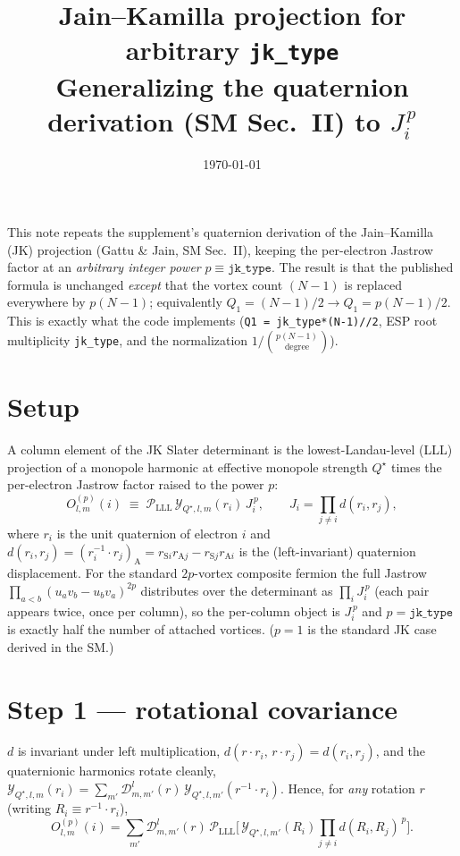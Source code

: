 \documentclass[11pt]{article}
\title{\textbf{Jain--Kamilla projection for arbitrary \texttt{jk\_type}}\\[2pt]
\large Generalizing the quaternion derivation (SM Sec.~II) to $J_i^{\,p}$}
\author{}
\date{\today}
\newcommand{\LLL}{\mathcal{P}_{\mathrm{LLL}}}
\newcommand{\Ycal}{\mathcal{Y}}
\newcommand{\Dcal}{\mathcal{D}}
\newcommand{\Qs}{Q^{\star}}
\newcommand{\jk}{\mathtt{jk\_type}}
\begin{document}
\maketitle

\noindent
This note repeats the supplement's quaternion derivation of the Jain--Kamilla (JK) projection
(Gattu \& Jain, SM Sec.~II), keeping the per-electron Jastrow factor at an \emph{arbitrary
integer power} $p \equiv \jk$. The result is that the published formula is unchanged
\emph{except} that the vortex count $(N-1)$ is replaced everywhere by $p(N-1)$; equivalently
$Q_1 = (N-1)/2 \to Q_1 = p(N-1)/2$. This is exactly what the code implements
(\texttt{Q1 = jk\_type*(N-1)//2}, ESP root multiplicity \texttt{jk\_type}, and the
normalization $1/\binom{p(N-1)}{\text{degree}}$).

\section{Setup}

A column element of the JK Slater determinant is the lowest-Landau-level (LLL) projection of a
monopole harmonic at effective monopole strength $\Qs$ times the per-electron Jastrow factor
raised to the power $p$:
\begin{equation}
  O^{(p)}_{l,m}(i)\;\equiv\;\LLL\,\Ycal_{\Qs,l,m}(r_i)\,J_i^{\,p},
  \qquad
  J_i=\prod_{j\neq i} d(r_i,r_j),
  \label{eq:object}
\end{equation}
where $r_i$ is the unit quaternion of electron $i$ and
$d(r_i,r_j)=(r_i^{-1}\!\cdot r_j)_{\mathrm A}=r_{\mathrm{S}i}r_{\mathrm{A}j}-r_{\mathrm{S}j}r_{\mathrm{A}i}$
is the (left-invariant) quaternion displacement. For the standard $2p$-vortex composite fermion
the full Jastrow $\prod_{a<b}(u_av_b-u_bv_a)^{2p}$ distributes over the determinant as
$\prod_i J_i^{\,p}$ (each pair appears twice, once per column), so the per-column object is
$J_i^{\,p}$ and $p=\jk$ is exactly half the number of attached vortices. ($p=1$ is the standard
JK case derived in the SM.)

\section{Step 1 --- rotational covariance}

$d$ is invariant under left multiplication, $d(r\cdot r_i,\,r\cdot r_j)=d(r_i,r_j)$, and the
quaternionic harmonics rotate cleanly,
$\Ycal_{\Qs,l,m}(r_i)=\sum_{m'}\Dcal^{l}_{m,m'}(r)\,\Ycal_{\Qs,l,m'}(r^{-1}\!\cdot r_i)$.
Hence, for \emph{any} rotation $r$ (writing $R_i\equiv r^{-1}\!\cdot r_i$),
\begin{equation}
  O^{(p)}_{l,m}(i)=\sum_{m'}\Dcal^{l}_{m,m'}(r)\,
  \LLL\Big[\,\Ycal_{\Qs,l,m'}(R_i)\prod_{j\neq i} d(R_i,R_j)^{\,p}\Big].
  \label{eq:cov}
\end{equation}
\end{document}
